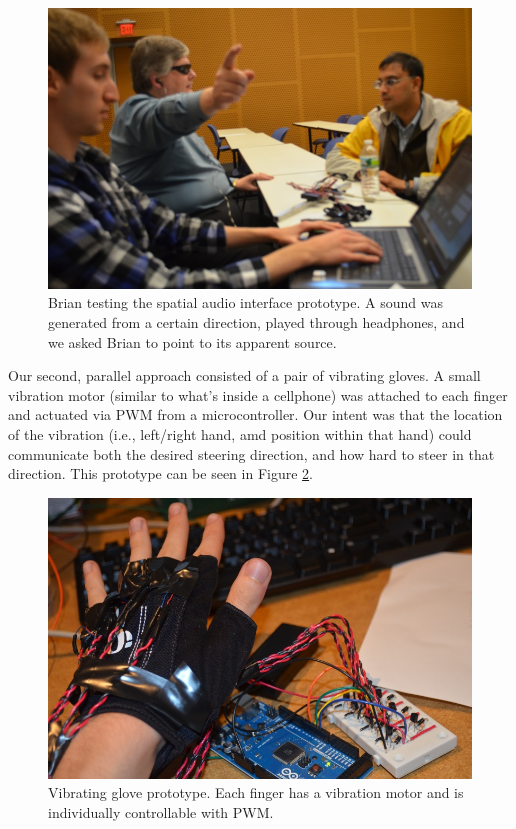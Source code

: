 \documentclass[aps,twocolumn,secnumarabic,balancelastpage,amsmath,amssymb,nofootinbib]{revtex4-1}
\begin{document}
\begin{figure}
\includegraphics[scale=0.22]{spatial_audio.jpg}
\caption{Brian testing the spatial audio interface prototype. A sound was generated from a certain direction, played through headphones, and we asked Brian to point to its apparent source.}
\label{fig:SpatialAudio}
\end{figure}


Our second, parallel approach consisted of a pair of vibrating gloves. A small vibration motor (similar to what's inside a cellphone) was attached to each finger and actuated via PWM from a microcontroller. Our intent was that the location of the vibration (i.e., left/right hand, amd position within that hand) could communicate both the desired steering direction, and how hard to steer in that direction. This prototype can be seen in Figure  \ref{fig:VibratorGlove}.

\begin{figure}
\includegraphics[scale=0.22]{glove_prototype.jpg}
\caption{Vibrating glove prototype. Each finger has a vibration motor and is individually controllable with PWM.}
\label{fig:VibratorGlove}
\end{figure}
\end{document}
